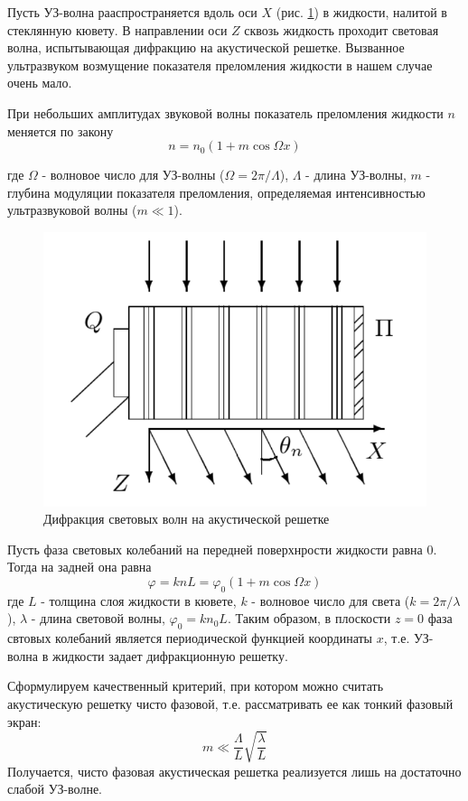 \documentclass[a4paper,12pt]{article}
\begin{document}
Пусть УЗ-волна рааспространяется вдоль оси $X$ (рис. \ref{img1}) в жидкости, налитой в стеклянную кювету. В направлении оси $Z$ сквозь жидкость проходит световая волна, испытывающая дифракцию на акустической решетке. Вызванное ультразвуком возмущение показателя преломления жидкости в нашем случае очень мало. 

При небольших амплитудах звуковой волны показатель преломления жидкости $n$ меняется по закону 
\begin{equation}
n = n_0(1+m\cos{\Omega x})    
\end{equation}

где $\Omega$ - волновое число для УЗ-волны ($\Omega = 2\pi/\Lambda$), $\Lambda$ - длина УЗ-волны, $m$ - глубина модуляции показателя преломления, определяемая интенсивностью ультразвуковой волны ($m\ll 1$).
\newpage

\begin{figure}[h]
\centering
\includegraphics[width=0.5\linewidth]{img1.png}
\caption{Дифракция световых волн на акустической решетке}
\label{img1}
\end{figure}

Пусть фаза световых колебаний на передней поверхнрости жидкости равна 0. Тогда на задней она равна 
\begin{equation}
\varphi = knL = \varphi_0(1+m\cos{\Omega x})
\end{equation}
где $L$ - толщина слоя жидкости в кювете, $k$ - волновое число для света ($k=2\pi/\lambda$), $\lambda$ - длина световой волны, $\varphi_0 = kn_0L$. Таким образом, в плоскости $z=0$ фаза свтовых колебаний является периодической функцией координаты $x$, т.е. УЗ-волна в жидкости задает дифракционную решетку.

Сформулируем качественный критерий, при котором можно считать акустическую решетку чисто фазовой, т.е. рассматривать ее как тонкий фазовый экран: 
\begin{equation}
m \ll \frac{\Lambda}{L}\sqrt{\frac{\lambda}{L}}
\end{equation}
Получается, чисто фазовая акустическая решетка реализуется лишь на достаточно слабой УЗ-волне. 
\end{document}
